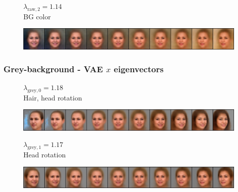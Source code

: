 \documentclass{article}
\begin{document}
\begin{figure}[H]
  \centering
  \begin{minipage}{.18\linewidth}
      \centering
      $\lambda_{\text{raw}, 2} = 1.14$ \\
      BG color
  \end{minipage}%
  \hfill
  \begin{minipage}{.81\linewidth}
      \centering
      \includegraphics[width=\linewidth]{eigen/raw_vae_2.png}
  \end{minipage}
\end{figure}

\subsubsection*{Grey-background - VAE $x$ eigenvectors}

\begin{figure}[H]
  \centering
  \begin{minipage}{.18\linewidth}
      \centering
      $\lambda_{\text{grey}, 0} = 1.18$ \\
      Hair, head rotation
  \end{minipage}%
  \hfill
  \begin{minipage}{.81\linewidth}
      \centering
      \includegraphics[width=\linewidth]{eigen/grey_vae_0.png}
  \end{minipage}
\end{figure}

\begin{figure}[H]
  \centering
  \begin{minipage}{.18\linewidth}
      \centering
      $\lambda_{\text{grey}, 1} = 1.17$ \\
      Head rotation
  \end{minipage}%
  \hfill
  \begin{minipage}{.81\linewidth}
      \centering
      \includegraphics[width=\linewidth]{eigen/grey_vae_1.png}
  \end{minipage}
\end{figure}
\end{document}
